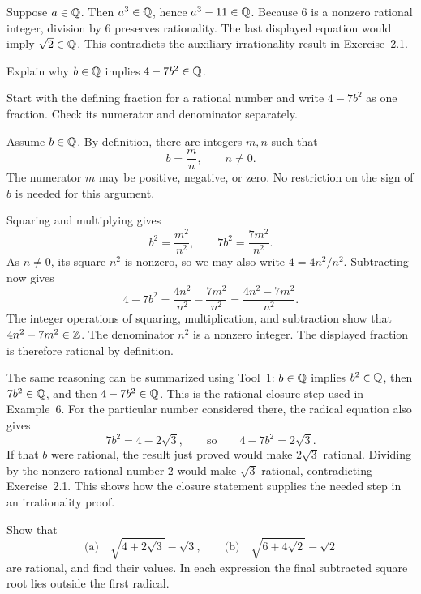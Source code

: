 Suppose $a\in\mathbb{Q}$. Then $a^3\in\mathbb{Q}$, hence $a^3-11\in\mathbb{Q}$.
Because $6$ is a nonzero rational integer, division by $6$ preserves
rationality. The last displayed equation would imply $\sqrt2\in\mathbb{Q}$.
This contradicts the auxiliary irrationality result in Exercise~2.1.


\goal Explain why $b\in\mathbb{Q}$ implies $4-7b^2\in\mathbb{Q}$.

\idea Start with the defining fraction for a rational number and write
$4-7b^2$ as one fraction. Check its numerator and denominator separately.

Assume $b\in\mathbb{Q}$. By definition, there are integers $m,n$ such that
\[
 b=\frac mn,\qquad n\ne0.
\]
The numerator $m$ may be positive, negative, or zero. No restriction on
the sign of $b$ is needed for this argument.

Squaring and multiplying gives
\[
 b^2=\frac{m^2}{n^2},
 \qquad 7b^2=\frac{7m^2}{n^2}.
\]
As $n\ne0$, its square $n^2$ is nonzero, so we may also write
$4=4n^2/n^2$. Subtracting now gives
\[
 4-7b^2
 =\frac{4n^2}{n^2}-\frac{7m^2}{n^2}
 =\frac{4n^2-7m^2}{n^2}.
\]
The integer operations of squaring, multiplication, and subtraction
show that $4n^2-7m^2\in\mathbb{Z}$. The denominator $n^2$ is a nonzero
integer. The displayed fraction is therefore rational by definition.

The same reasoning can be summarized using Tool~1: $b\in\mathbb{Q}$ implies
$b^2\in\mathbb{Q}$, then $7b^2\in\mathbb{Q}$, and then $4-7b^2\in\mathbb{Q}$.
This is the rational-closure step used in Example~6. For the particular
number considered there, the radical equation also gives
\[
 7b^2=4-2\sqrt3,
 \qquad\text{so}\qquad
 4-7b^2=2\sqrt3.
\]
If that $b$ were rational, the result just proved would make
$2\sqrt3$ rational. Dividing by the nonzero rational number $2$ would
make $\sqrt3$ rational, contradicting Exercise~2.1. This shows how the
closure statement supplies the needed step in an irrationality proof.


\goal Show that
\[
 \text{(a)}\quad \sqrt{4+2\sqrt3}-\sqrt3,
 \qquad
 \text{(b)}\quad \sqrt{6+4\sqrt2}-\sqrt2
\]
are rational, and find their values. In each expression the final
subtracted square root lies outside the first radical.

